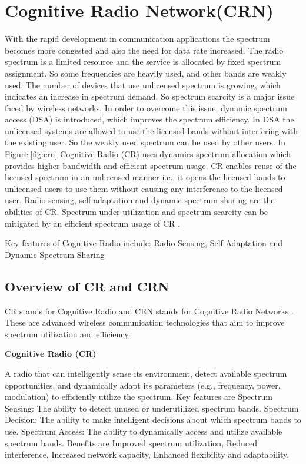\section{\textbf{Cognitive Radio Network(CRN)}}
With the rapid development in communication applications the spectrum becomes more congested and also the need for data rate increased. The radio spectrum is a limited resource and the service is allocated by fixed spectrum assignment. So some frequencies are heavily used, and other bands are weakly used.
The number of devices that use unlicensed spectrum is growing, which indicates an increase in spectrum demand. So spectrum scarcity is a major issue faced by wireless networks. In order to overcome this issue, dynamic spectrum access (DSA) is introduced, which improves the spectrum efficiency. In DSA the unlicensed systems are allowed to use the licensed bands without interfering with the existing user. So the weakly used spectrum can be used by other users. In Figure:\ref{fig:crn} Cognitive Radio (CR)
uses dynamics spectrum allocation which provides higher bandwidth and efficient spectrum usage. CR enables reuse of the licensed spectrum in an unlicensed manner i.e., it opens the licensed bands to unlicensed users to use them without causing any interference to the licensed user. Radio sensing, self adaptation and dynamic spectrum sharing are the abilities of CR. Spectrum under utilization and spectrum scarcity can be mitigated by an efficient spectrum usage of CR \cite{ref2}. 

Key features of Cognitive Radio include:
    Radio Sensing,
    Self-Adaptation
    and Dynamic Spectrum Sharing




\subsection{\textbf{Overview of CR and CRN}}

CR stands for Cognitive Radio and CRN stands for Cognitive Radio Networks \cite{ref1}. These are advanced wireless communication technologies that aim to improve spectrum utilization and efficiency.

\textbf{Cognitive Radio (CR)}

    A radio that can intelligently sense its environment, detect available spectrum opportunities, and dynamically adapt its parameters (e.g., frequency, power, modulation) to efficiently utilize the spectrum.
    Key features are 
        Spectrum Sensing: The ability to detect unused or underutilized spectrum bands.
        Spectrum Decision: The ability to make intelligent decisions about which spectrum bands to use.
        Spectrum Access: The ability to dynamically access and utilize available spectrum bands.
    Benefits are  
        Improved spectrum utilization, Reduced interference, Increased network capacity, Enhanced flexibility and adaptability. \\ 

